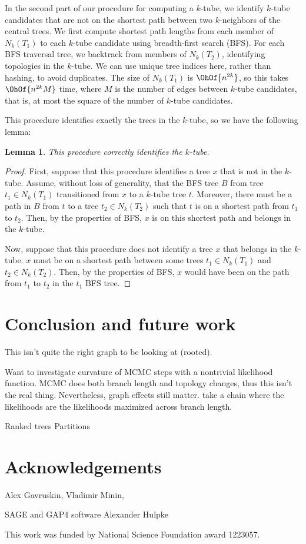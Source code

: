 \documentclass{amsart}
\newtheorem{lemma}[theorem]{Lemma}
\begin{document}
In the second part of our procedure for computing a $k$-tube, we identify $k$-tube candidates that are not on the shortest path between two $k$-neighbors of the central trees.
We first compute shortest path lengths from each member of $N_k(T_1)$ to each $k$-tube candidate using breadth-first search (BFS).
For each BFS traversal tree, we backtrack from members of $N_k(T_2)$, identifying topologies in the $k$-tube.
We can use unique tree indices here, rather than hashing, to avoid duplicates.
The size of $N_k(T_1)$ is $\OhOf{n^{2k}}$, so this takes
$\OhOf{ n^{2k} M}$ time, where $M$ is the number of edges between $k$-tube candidates, that is, at most the square of the number of $k$-tube candidates.

This procedure identifies exactly the trees in the $k$-tube, so we have the following lemma:
\begin{lemma}
	\label{lem:k_tube_correctness}
	This procedure correctly identifies the $k$-tube.
\end{lemma}
\begin{proof}
	First, suppose that this procedure identifies a tree $x$ that is not in the $k$-tube.
	Assume, without loss of generality, that the BFS tree $B$ from tree $t_1 \in N_k(T_1)$ transitioned from $x$ to a $k$-tube tree $t$.
	Moreover, there must be a path in $B$ from $t$ to a tree $t_2 \in N_k(T_2)$ such that $t$ is on a shortest path from $t_1$ to $t_2$.
	Then, by the properties of BFS, $x$ is on this shortest path and belongs in the $k$-tube.

	Now, suppose that this procedure does not identify a tree $x$ that belongs in the $k$-tube.
	$x$ must be on a shortest path between some trees $t_1 \in N_k(T_1)$ and $t_2 \in N_k(T_2)$.
	Then, by the properties of BFS, $x$ would have been on the path from $t_1$ to $t_2$ in the $t_1$ BFS tree.
\end{proof}

\section{Conclusion and future work}
This isn't quite the right graph to be looking at (rooted).

Want to investigate curvature of MCMC steps with a nontrivial likelihood function.
MCMC does both branch length and topology changes, thus this isn't the real thing.
Nevertheless, graph effects still matter.
\cite{Stefankovic2011-hu} take a chain where the likelihoods are the likelihoods maximized across branch length.

Ranked trees \cite{Song2006-xe}
Partitions \cite{Gusfield2002-il}


\section{Acknowledgements}
Alex Gavruskin,
Vladimir Minin,

SAGE and GAP4 software
Alexander Hulpke

This work was funded by National Science Foundation award 1223057.



\end{document}
